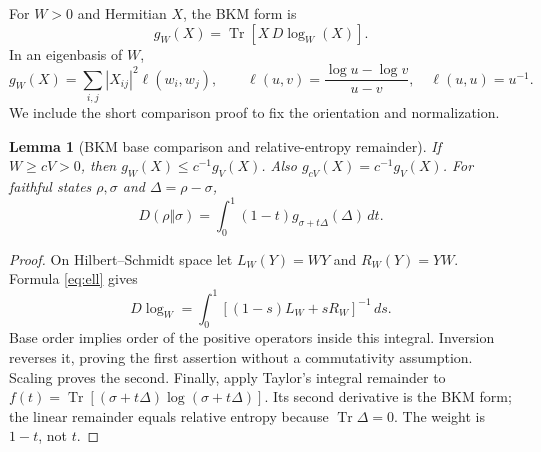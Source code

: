 \documentclass[11pt]{article}
\newtheorem{lemma}[theorem]{Lemma}
\newcommand{\Tr}{\operatorname{Tr}}
\begin{document}
For $W>0$ and Hermitian $X$, the BKM form is
\[
 g_W(X)=\Tr[X\,D\log_W(X)].
\]
In an eigenbasis of $W$,
\begin{equation}\label{eq:ell}
 g_W(X)=\sum_{i,j}|X_{ij}|^2\ell(w_i,w_j),\qquad
 \ell(u,v)=\frac{\log u-\log v}{u-v},\quad \ell(u,u)=u^{-1}.
\end{equation}
We include the short comparison proof to fix the orientation and normalization.

\begin{lemma}[BKM base comparison and relative-entropy remainder]\label{lem:bkm}
If $W\ge cV>0$, then $g_W(X)\le c^{-1}g_V(X)$. Also $g_{cV}(X)=c^{-1}g_V(X)$. For faithful states $\rho,\sigma$ and $\Delta=\rho-\sigma$,
\begin{equation}\label{eq:integral}
 D(\rho\Vert\sigma)=\int_0^1(1-t)g_{\sigma+t\Delta}(\Delta)\,dt.
\end{equation}
\end{lemma}
\begin{proof}
On Hilbert--Schmidt space let $L_W(Y)=WY$ and $R_W(Y)=YW$. Formula \eqref{eq:ell} gives
\[
 D\log_W=\int_0^1[(1-s)L_W+sR_W]^{-1}\,ds.
\]
Base order implies order of the positive operators inside this integral. Inversion reverses it, proving the first assertion without a commutativity assumption. Scaling proves the second. Finally, apply Taylor's integral remainder to $f(t)=\Tr[(\sigma+t\Delta)\log(\sigma+t\Delta)]$. Its second derivative is the BKM form; the linear remainder equals relative entropy because $\Tr\Delta=0$. The weight is $1-t$, not $t$.
\end{proof}
\end{document}
